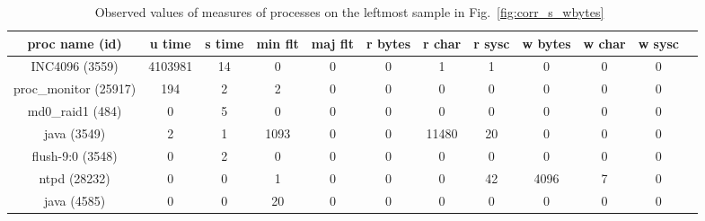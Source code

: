 \begin{table}[htp!]
\begin{center}
\begin{tabular}{|c|c|c|c|c|c|c|c|c|c|c|c|} \hline
proc name (id) & u time & s time & min flt & maj flt & r bytes & r char & r sysc & w bytes & w char & w sysc\\ \hline
INC4096 (3559) & 4103981 & 14 & 0 & 0 & 0 & 1 & 1 & 0 & 0 & 0 \\ \hline
proc\_monitor (25917) & 194 & 2 & 2 & 0 & 0 & 0 & 0 & 0 & 0 & 0 \\ \hline
md0\_raid1 (484) & 0 & 5 & 0 & 0 & 0 & 0 & 0 & 0 & 0 & 0 \\ \hline
java (3549) & 2 & 1 & 1093 & 0 & 0 & 11480 & 20 & 0 & 0 & 0 \\ \hline
flush-9:0 (3548) & 0 & 2 & 0 & 0 & 0 & 0 & 0 & 0 & 0 & 0 \\ \hline
ntpd (28232) & 0 & 0 & 1 & 0 & 0 & 0 & 42 & 4096 & 7 & 0 \\ \hline
java (4585) & 0 & 0 & 20 & 0 & 0 & 0 & 0 & 0 & 0 & 0 \\ \hline
\end{tabular}
\end{center}
\caption{Observed values of measures of processes on the leftmost sample in Fig.~\ref{fig:corr_s_wbytes}~\label{tab:breakdown4}}
\end{table}

